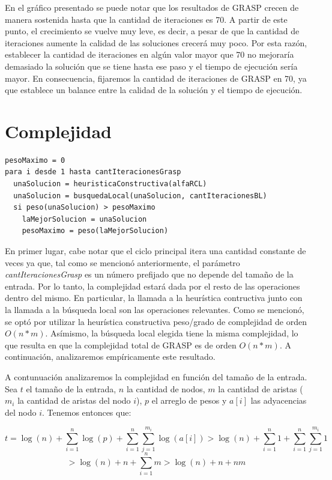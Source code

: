 \documentclass[a4paper,11pt] {article}
\begin{document}
En el gr\'afico presentado se puede notar que los resultados de GRASP crecen de manera sostenida hasta que la cantidad de iteraciones es 70. A partir de este punto, el crecimiento se vuelve muy leve, es decir, a pesar de que la cantidad de iteraciones aumente la calidad de las soluciones crecer\'a muy poco. Por esta raz\'on, establecer la cantidad de iteraciones en alg\'un valor mayor que 70 no mejorar\'ia demasiado la soluci\'on que se tiene hasta ese paso y el tiempo de ejecuci\'on ser\'ia mayor. En consecuencia, fijaremos la cantidad de iteraciones de GRASP en 70, ya que establece un balance entre la calidad de la soluci\'on y el tiempo de ejecuci\'on.


\section*{Complejidad}

\begin{verbatim}
pesoMaximo = 0
para i desde 1 hasta cantIteracionesGrasp
  unaSolucion = heuristicaConstructiva(alfaRCL)
  unaSolucion = busquedaLocal(unaSolucion, cantIteracionesBL)
  si peso(unaSolucion) > pesoMaximo
    laMejorSolucion = unaSolucion
    pesoMaximo = peso(laMejorSolucion)
\end{verbatim}

En primer lugar, cabe notar que el ciclo principal itera una cantidad constante de veces ya que, tal como se mencionó anteriormente, el parámetro \textit{cantIteracionesGrasp} es un número prefijado que no depende del tamaño de la entrada. Por lo tanto, la complejidad estará dada por el resto de las operaciones dentro del mismo. En particular, la llamada a la heurística contructiva junto con la llamada a la búsqueda local son las operaciones relevantes. Como se mencionó, se optó por utilizar la heurística constructiva peso/grado de complejidad de orden $O(n*m)$. Asímismo, la búsqueda local elegida tiene la misma complejidad, lo que resulta en que la complejidad total de GRASP es de orden $O(n*m)$. A continuación, analizaremos empíricamente este resultado.

A contunuaci\'on analizaremos la complejidad en funci\'on del tama\~{n}o de la entrada. Sea $t$ el tama\~{n}o de la entrada, $n$ la cantidad de nodos, $m$ la cantidad de aristas ($m_i$ la cantidad de aristas del nodo $i$), $p$ el arreglo de pesos y $a[i]$ las adyacencias del nodo $i$. Tenemos entonces que:

$$t=\log(n)+\sum_{i=1}^{n}\log(p)+\sum_{i=1}^{n}\sum_{j=1}^{m_i}\log(a[i])>\log(n)+\sum_{i=1}^{n}1+\sum_{i=1}^{n}\sum_{j=1}^{m_i}1$$
$$>\log(n)+n+\sum_{i=1}^{n}m>\log(n)+n+nm$$
\end{document}
